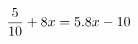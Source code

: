 \documentclass[preview]{standalone}
\begin{document}
\begin{align*}
\special{dvisvgm:raw <g id='unique000'>}\frac{5}{10} + 8x = 5.8x - 10\special{dvisvgm:raw </g>}
\end{align*}
\end{document}
